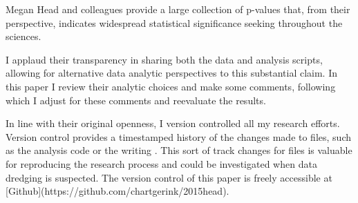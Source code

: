 Megan Head and colleagues provide a large collection of p-values that, from their perspective, indicates widespread statistical significance seeking throughout the sciences. 

I applaud their transparency in sharing both the data and analysis scripts, allowing for alternative data analytic perspectives to this substantial claim. In this paper I review their analytic choices and make some comments, following which I adjust for these comments and reevaluate the results.

In line with their original openness, I version controlled all my research efforts. Version control provides a timestamped history of the changes made to files, such as the analysis code or the writing \citep{Ram2015}. This sort of track changes for files is valuable for reproducing the research process and could be investigated when data dredging is suspected. The version control of this paper is freely accessible at [Github](https://github.com/chartgerink/2015head).
